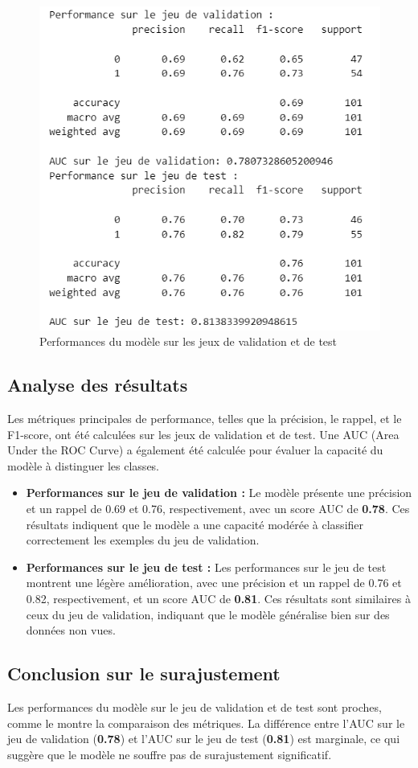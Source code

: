 \begin{figure}[H]
    \centering
    \includegraphics[width=0.6\linewidth]{OVERFIT.png}
    \caption{Performances du modèle sur les jeux de validation et de test}
    \label{fig:overfit}
\end{figure}

\subsection{Analyse des résultats}
Les métriques principales de performance, telles que la précision, le rappel, et le F1-score, ont été calculées sur les jeux de validation et de test. Une AUC (Area Under the ROC Curve) a également été calculée pour évaluer la capacité du modèle à distinguer les classes.

\begin{itemize}
    \item \textbf{Performances sur le jeu de validation :} Le modèle présente une précision et un rappel de 0.69 et 0.76, respectivement, avec un score AUC de \textbf{0.78}. Ces résultats indiquent que le modèle a une capacité modérée à classifier correctement les exemples du jeu de validation.
    \item \textbf{Performances sur le jeu de test :} Les performances sur le jeu de test montrent une légère amélioration, avec une précision et un rappel de 0.76 et 0.82, respectivement, et un score AUC de \textbf{0.81}. Ces résultats sont similaires à ceux du jeu de validation, indiquant que le modèle généralise bien sur des données non vues.
\end{itemize}

\subsection{Conclusion sur le surajustement}
Les performances du modèle sur le jeu de validation et de test sont proches, comme le montre la comparaison des métriques. La différence entre l'AUC sur le jeu de validation (\textbf{0.78}) et l'AUC sur le jeu de test (\textbf{0.81}) est marginale, ce qui suggère que le modèle ne souffre pas de surajustement significatif.

